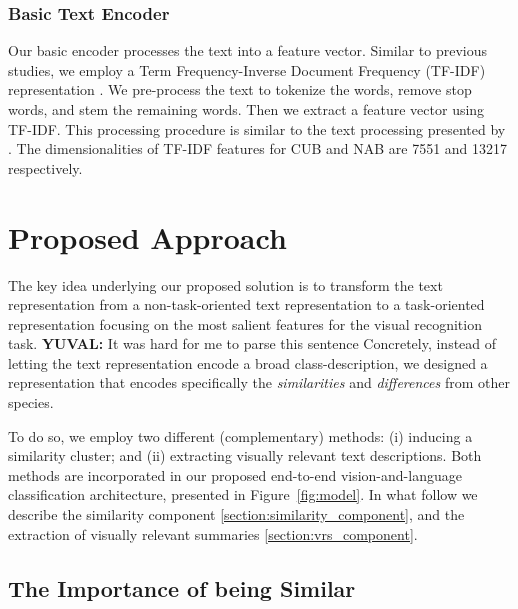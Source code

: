 \documentclass[11pt,a4paper]{article}
\newcommand\yuval[1]{\textcolor{darkpink}{\textbf{YUVAL:} #1 }}
\begin{document}
\subsubsection{Basic Text Encoder}
\label{section:Text_Encoder}
Our basic encoder processes the text into a feature vector. Similar to previous studies, we employ a Term Frequency-Inverse Document Frequency (TF-IDF)  representation \citep{salton1988term}. %
We pre-process the text to tokenize the words, remove stop words, and stem the remaining words. Then we extract a feature vector using TF-IDF. This processing procedure is similar to the text processing presented by \citet{zhu2018generative}.
The dimensionalities of TF-IDF features for CUB and NAB are 7551 and 13217 respectively. 

\section{Proposed Approach}
\label{sections:ZEST}
The key idea underlying our proposed solution is to transform the text representation from a non-task-oriented text representation to a task-oriented representation focusing on the most salient features for the visual recognition task. \yuval{It was hard for me to parse this sentence}
Concretely, instead of letting the text representation encode a broad class-description, we designed a representation that encodes specifically the {\em similarities} and {\em differences} from other species. 

To do so, we employ two different (complementary) methods: (i)  inducing a similarity cluster; and (ii)  extracting visually relevant text descriptions. Both methods are incorporated in our proposed end-to-end vision-and-language classification architecture, presented in Figure~\ref{fig:model}. In what follow we describe the similarity component \ref{section:similarity_component}, and the extraction of visually relevant summaries \ref{section:vrs_component}.


\subsection{The Importance of being Similar}
\end{document}
